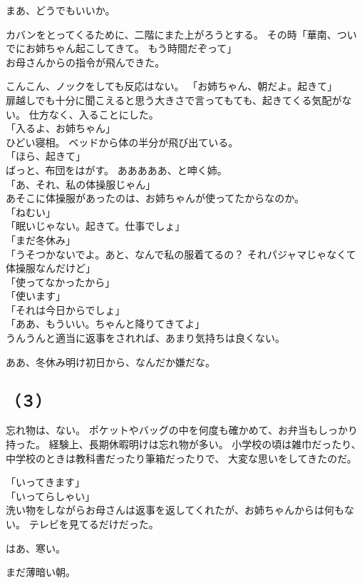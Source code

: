 \documentclass[../IHMain]{subfiles}
\begin{document}
まあ、どうでもいいか。

カバンをとってくるために、二階にまた上がろうとする。
その時「華南、ついでにお姉ちゃん起こしてきて。
もう時間だぞって」\\
お母さんからの指令が飛んできた。

こんこん、ノックをしても反応はない。
「お姉ちゃん、朝だよ。起きて」\\
扉越しでも十分に聞こえると思う大きさで言ってもても、起きてくる気配がない。
仕方なく、入ることにした。\\
「入るよ、お姉ちゃん」\\
ひどい寝相。
ベッドから体の半分が飛び出ている。\\
「ほら、起きて」\\
ばっと、布団をはがす。
あああああ、と呻く姉。\\
「あ、それ、私の体操服じゃん」\\
あそこに体操服があったのは、お姉ちゃんが使ってたからなのか。\\
「ねむい」\\
「眠いじゃない。起きて。仕事でしょ」\\
「まだ冬休み」\\
「うそつかないでよ。あと、なんで私の服着てるの？
それパジャマじゃなくて体操服なんだけど」\\
「使ってなかったから」\\
「使います」\\
「それは今日からでしょ」\\
「ああ、もういい。ちゃんと降りてきてよ」\\
うんうんと適当に返事をされれば、あまり気持ちは良くない。

ああ、冬休み明け初日から、なんだか嫌だな。

\subsection*{\gt（３）}
忘れ物は、ない。
ポケットやバッグの中を何度も確かめて、お弁当もしっかり持った。
経験上、長期休暇明けは忘れ物が多い。
小学校の頃は雑巾だったり、中学校のときは教科書だったり筆箱だったりで、
大変な思いをしてきたのだ。

「いってきます」\\
「いってらしゃい」\\
洗い物をしながらお母さんは返事を返してくれたが、お姉ちゃんからは何もない。
テレビを見てるだけだった。

はあ、寒い。

まだ薄暗い朝。
\end{document}
